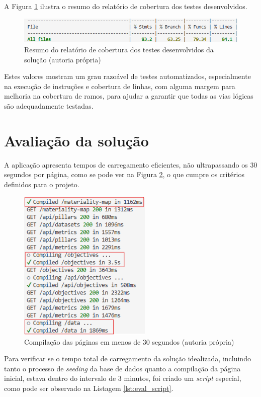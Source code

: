 A Figura \ref{fig:coverage} ilustra o resumo do relatório de cobertura dos testes desenvolvidos. 

\begin{figure}[H]
    \centering
    \includegraphics[width=\linewidth,keepaspectratio]{frontmatter/assets/tests/coverage.png}
    \caption{Resumo do relatório de cobertura dos testes desenvolvidos da solução (autoria própria)}
    \label{fig:coverage}
\end{figure}

Estes valores mostram um grau razoável de testes automatizados, especialmente na execução de instruções e cobertura de linhas, com alguma margem para melhoria na cobertura de ramos, para ajudar a garantir que todas as vias lógicas são adequadamente testadas.

\section{Avaliação da solução} 

A aplicação apresenta tempos de carregamento eficientes, não ultrapassando os 30 segundos por página, como se pode ver na Figura \ref{fig:page_compiling}, o que cumpre os critérios definidos para o projeto.

\begin{figure}[H]
    \centering
    \includegraphics[width=2.5in,keepaspectratio]{frontmatter/assets/compiling/pages_time.png}
    \caption{Compilação das páginas em menos de 30 segundos (autoria própria)}
    \label{fig:page_compiling}
\end{figure}

Para verificar se o tempo total de carregamento da solução idealizada, incluindo tanto o processo de \textit{seeding} da base de dados quanto a compilação da página inicial, estava dentro do intervalo de 3 minutos, foi criado um \textit{script} especial, como pode ser observado na Listagem \ref{lst:eval_script}.

